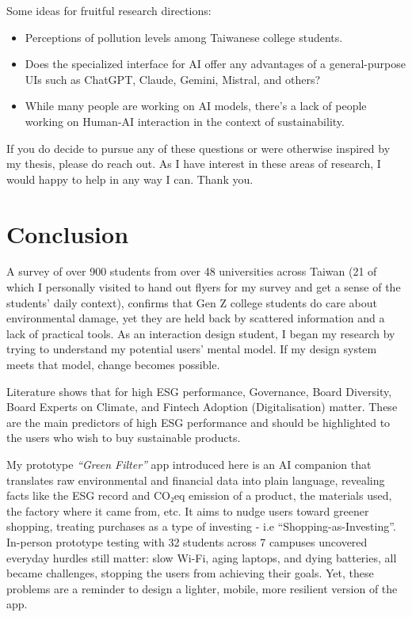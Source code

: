 \documentclass[
  12pt,
  letterpaper,
  DIV=11,
  numbers=noendperiod]{scrartcl}
\begin{document}
Some ideas for fruitful research directions:

\begin{itemize}
\item
  Perceptions of pollution levels among Taiwanese college students.
\item
  Does the specialized interface for AI offer any advantages of a
  general-purpose UIs such as ChatGPT, Claude, Gemini, Mistral, and
  others?
\item
  While many people are working on AI models, there's a lack of people
  working on Human-AI interaction in the context of sustainability.
\end{itemize}

If you do decide to pursue any of these questions or were otherwise
inspired by my thesis, please do reach out. As I have interest in these
areas of research, I would happy to help in any way I can. Thank you.

\newpage

\section{Conclusion}\label{conclusion}

A survey of over 900 students from over 48 universities across Taiwan
(21 of which I personally visited to hand out flyers for my survey and
get a sense of the students' daily context), confirms that Gen Z college
students do care about environmental damage, yet they are held back by
scattered information and a lack of practical tools. As an interaction
design student, I began my research by trying to understand my potential
users' mental model. If my design system meets that model, change
becomes possible.

Literature shows that for high ESG performance, Governance, Board
Diversity, Board Experts on Climate, and Fintech Adoption
(Digitalisation) matter. These are the main predictors of high ESG
performance and should be highlighted to the users who wish to buy
sustainable products.

My prototype \emph{``Green Filter''} app introduced here is an AI
companion that translates raw environmental and financial data into
plain language, revealing facts like the ESG record and CO₂eq emission
of a product, the materials used, the factory where it came from, etc.
It aims to nudge users toward greener shopping, treating purchases as a
type of investing - i.e ``Shopping-as-Investing''. In-person prototype
testing with 32 students across 7 campuses uncovered everyday hurdles
still matter: slow Wi-Fi, aging laptops, and dying batteries, all became
challenges, stopping the users from achieving their goals. Yet, these
problems are a reminder to design a lighter, mobile, more resilient
version of the app.
\end{document}
